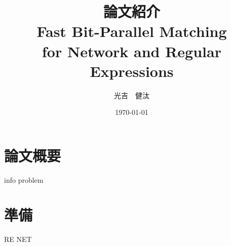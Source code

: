\documentclass[dvipdfmx,14pt,notheorems]{beamer} %
\title[略タイトル]{論文紹介\\ {\normalsize Fast Bit-Parallel Matching \\for Network and Regular Expressions}} %
\author[Mitsuyoshi]{光吉　健汰\inst{1}}
\institute[IKN]{\inst{1}北海道大学工学部 情報エレクトロニクス学科 情報理工学コース 4年\\
情報知識ネットワーク研究室}
\date{\today}%
\begin{document}
\begin{frame}
	\frametitle{}
	\titlepage
\end{frame}


\section{論文概要}
{info}
{problem}

\section{準備}
{RE}
{NET}

	
\end{document}
